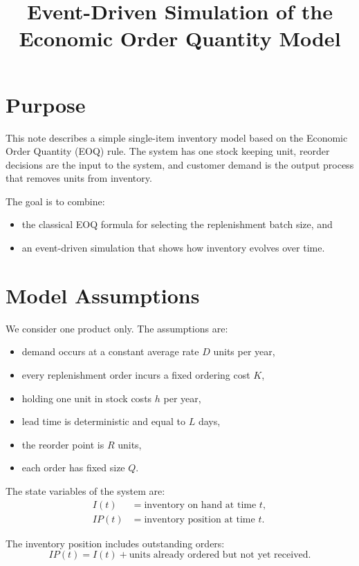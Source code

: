 \documentclass[11pt]{article}
\title{Event-Driven Simulation of the Economic Order Quantity Model}
\author{}
\date{}
\begin{document}
\maketitle

\section{Purpose}
This note describes a simple single-item inventory model based on the Economic Order Quantity (EOQ) rule. The system has one stock keeping unit, reorder decisions are the input to the system, and customer demand is the output process that removes units from inventory.

The goal is to combine:
\begin{itemize}
  \item the classical EOQ formula for selecting the replenishment batch size, and
  \item an event-driven simulation that shows how inventory evolves over time.
\end{itemize}

\section{Model Assumptions}
We consider one product only. The assumptions are:
\begin{itemize}
  \item demand occurs at a constant average rate $D$ units per year,
  \item every replenishment order incurs a fixed ordering cost $K$,
  \item holding one unit in stock costs $h$ per year,
  \item lead time is deterministic and equal to $L$ days,
  \item the reorder point is $R$ units,
  \item each order has fixed size $Q$.
\end{itemize}

The state variables of the system are:
\begin{align}
I(t) &= \text{inventory on hand at time } t, \\
IP(t) &= \text{inventory position at time } t.
\end{align}

The inventory position includes outstanding orders:
\begin{equation}
IP(t) = I(t) + \text{units already ordered but not yet received.}
\end{equation}
\end{document}
